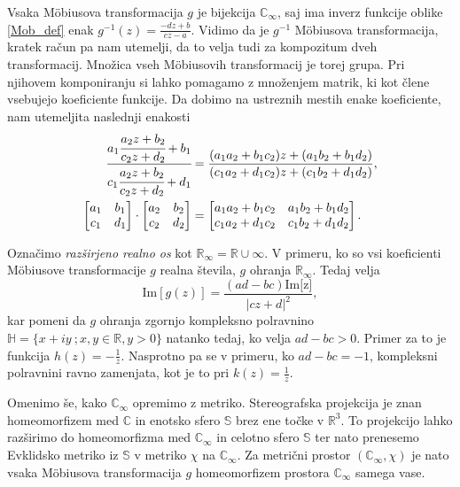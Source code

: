 \documentclass[a4paper,12pt]{article}
\def\R{\mathbb{R}} %
\def\C{\mathbb{C}} %
\def\Ci{\mathbb{C}_{\infty}} %
\def\H{\mathbb{H}} %
\begin{document}
Vsaka M\"{o}biusova transformacija $g$ je bijekcija $\Ci$, saj ima inverz funkcije oblike \eqref{Mob_def} enak $g^{-1}(z) = \frac{-dz + b}{cz - a}$. Vidimo da je $g^{-1}$ M\"{o}biusova transformacija, kratek račun pa nam utemelji, da to velja tudi za kompozitum dveh transformacij. Množica vseh M\"{o}biusovih transformacij je torej grupa. Pri njihovem komponiranju si lahko pomagamo z množenjem matrik, ki kot člene vsebujejo koeficiente funkcije. Da dobimo na ustreznih mestih enake koeficiente, nam utemeljita naslednji enakosti
\begin{align*}
    \cfrac{a_1\cfrac{a_2z + b_2}{c_2z + d_2} + b_1}{c_1\cfrac{a_2z + b_2}{c_2z + d_2} + d_1} &= \frac{(a_1a_2 + b_1c_2)z + (a_1b_2 + b_1d_2)}{(c_1a_2 + d_1c_2)z + (c_1b_2+d_1d_2)},
    \\
    \begin{bmatrix}
        a_1 & b_1\\
        c_1 & d_1
    \end{bmatrix}
    \cdot
    \begin{bmatrix}
        a_2 & b_2\\
        c_2 & d_2
    \end{bmatrix}
    &=
    \begin{bmatrix}
        a_1a_2 + b_1c_2 & a_1b_2 + b_1d_2\\
        c_1a_2 + d_1c_2 & c_1b_2+d_1d_2
    \end{bmatrix}.
\end{align*}

Označimo \emph{razširjeno realno os} kot $\R_{\infty} = \R \cup \infty$. 
V primeru, ko so vsi koeficienti M\"{o}biusove transformacije $g$ realna števila, $g$ ohranja $\R_{\infty}$. Tedaj velja
\[
    \text{Im}[g(z)] = \frac{(ad - bc)\text{Im[z]}}{|cz + d|^2},
\]
kar pomeni da $g$ ohranja zgornjo kompleksno polravnino $\H = \{x + iy\ ; x, y \in \R, y > 0\}$ natanko tedaj, ko velja $ad - bc > 0$. Primer za to je funkcija $h(z) = - \frac{1}{z}$. Nasprotno pa se v primeru, ko $ad - bc = -1$, kompleksni polravnini ravno zamenjata, kot je to pri $k(z) = \frac{1}{z}$.

Omenimo še, kako $\Ci$ opremimo z metriko. Stereografska projekcija je znan 
homeomorfizem med $\C$ in enotsko sfero $\mathbb{S}$ brez ene točke v $\R^3$. To projekcijo lahko razširimo do homeomorfizma med $\Ci$ in celotno sfero $\mathbb{S}$ ter nato prenesemo Evklidsko metriko iz $\mathbb{S}$ v metriko $\chi$ na $\Ci$. Za metrični prostor $(\Ci, \chi)$ je nato vsaka M\"{o}biusova transformacija $g$ homeomorfizem prostora $\Ci$ samega vase.
\end{document}
